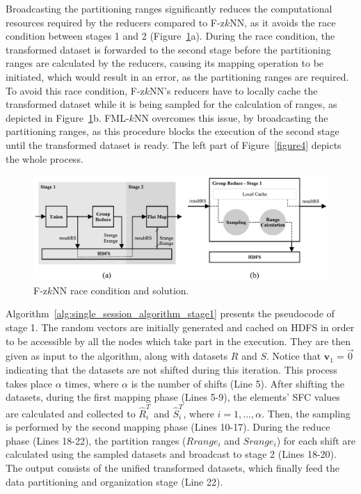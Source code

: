 Broadcasting the partitioning ranges significantly reduces the computational resources required by the reducers compared to F-z$k$NN, as it avoids the race condition between stages 1 and 2 (Figure~\ref{figure5}a). During the race condition, the transformed dataset is forwarded to the second stage before the partitioning ranges are calculated by the reducers, causing its mapping operation to be initiated, which would result in an error, as the partitioning ranges are required. To avoid this race condition, F-z$k$NN's reducers have to locally cache the transformed dataset while it is being sampled for the calculation of ranges, as depicted in Figure~\ref{figure5}b. FML-$k$NN overcomes this issue, by broadcasting the partitioning ranges, as this procedure blocks the execution of the second stage until the transformed dataset is ready. The left part of Figure~\ref{figure4} depicts the whole process.

\begin{figure}[!ht]
	\centering
	\includegraphics[width=\textwidth]{figures/figure5.pdf}
	\caption{F-z$k$NN race condition and solution.}
	\label{figure5}
\end{figure}

Algorithm~\ref{alg:single_session_algorithm_stage1} presents the pseudocode of stage 1. The random vectors are initially generated and cached on HDFS in order to be accessible by all the nodes which take part in the execution. They are then given as input to the algorithm, along with datasets $R$ and $S$. Notice that $\textbf{v}_1=\overrightarrow{0}$ indicating that the datasets are not shifted during this iteration. This process takes place $\alpha$ times, where $\alpha$  is the number of shifts (Line 5). After shifting the datasets, during the first mapping phase (Lines 5-9), the elements' SFC values are calculated and collected to $\hat{R}^T_i$ and $\hat{S}^T_i$, where $i=1,...,\alpha$. Then, the sampling is performed by the second mapping phase (Lines 10-17). During the reduce phase (Lines 18-22), the partition ranges ($Rrange_i$ and $Srange_i$) for each shift are calculated using the sampled datasets and broadcast to stage 2 (Lines 18-20). The output consists of the unified transformed datasets, which finally feed the data partitioning and organization stage (Line 22).

